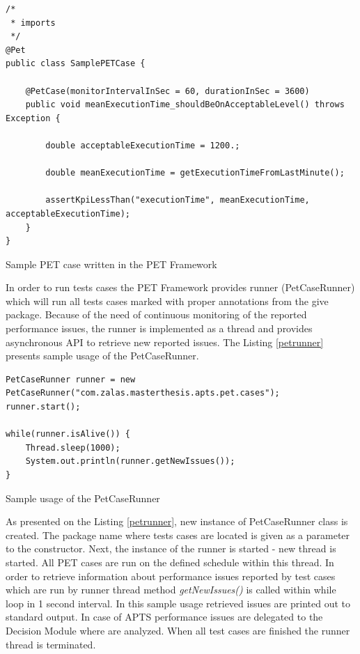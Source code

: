 \documentclass[10pt,a4paper]{article}
\begin{document}
\begin{listing}[ht]\begin{verbatim}
/*
 * imports
 */
@Pet
public class SamplePETCase {

    @PetCase(monitorIntervalInSec = 60, durationInSec = 3600)
    public void meanExecutionTime_shouldBeOnAcceptableLevel() throws Exception {
        
        double acceptableExecutionTime = 1200.;
        
        double meanExecutionTime = getExecutionTimeFromLastMinute();
        
        assertKpiLessThan("executionTime", meanExecutionTime, acceptableExecutionTime);
    }
}
\end{verbatim}
\caption{Sample PET case written in the PET Framework} \label{case}
\end{listing}

In order to run tests cases the PET Framework provides runner (PetCaseRunner) which will run all tests cases marked with proper annotations from the give package. Because of the need of continuous monitoring of the reported performance issues, the runner is implemented as a thread and provides asynchronous API to retrieve new reported issues. The Listing \ref{petrunner} presents sample usage of the PetCaseRunner. 

\begin{listing}[ht]\begin{verbatim}
PetCaseRunner runner = new PetCaseRunner("com.zalas.masterthesis.apts.pet.cases");
runner.start();

while(runner.isAlive()) {
    Thread.sleep(1000);
    System.out.println(runner.getNewIssues());
}
\end{verbatim}
\caption{Sample usage of the PetCaseRunner} \label{petrunner}
\end{listing}

As presented on the Listing \ref{petrunner}, new instance of PetCaseRunner class is created. The package name where tests cases are located is given as a parameter to the constructor. Next, the instance of the runner is started - new thread is started. All PET cases are run on the defined schedule within this thread. In order to retrieve information about performance issues reported by test cases which are run by runner thread method \textit{getNewIssues()} is called within while loop in 1 second interval. In this sample usage retrieved issues are printed out to standard output. In case of APTS performance issues are delegated to the Decision Module where are analyzed. When all test cases are finished the runner thread is terminated.    
\end{document}
